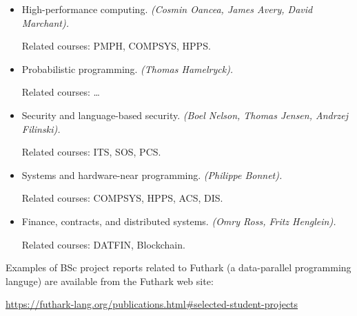 \documentclass[rgb,dvipsnames,aspectratio=169]{beamer}
\begin{document}
\begin{frame}[fragile]


  \vfill

  \begin{itemize}

  \item High-performance computing.
    \emph{(Cosmin Oancea, James Avery, David Marchant).}

    Related courses: PMPH, COMPSYS, HPPS.

  \item Probabilistic programming.
    \emph{(Thomas Hamelryck).}

    Related courses: …

  \item Security and language-based security.
    \emph{(Boel Nelson, Thomas Jensen, Andrzej Filinski).}

    Related courses: ITS, SOS, PCS.

  \item Systems and hardware-near programming.
    \emph{(Philippe Bonnet).}

    Related courses: COMPSYS, HPPS, ACS, DIS.

  \item Finance, contracts, and distributed systems.
    \emph{(Omry Ross, Fritz Henglein).}

    Related courses: DATFIN, Blockchain.
  \end{itemize}

\end{frame}

\begin{frame}[fragile]


  \vfill

  Examples of BSc project reports related to Futhark (a data-parallel
  programming languge) are available from the Futhark web site:

  \vfill
    \begin{center}
    \begin{footnotesize}
  \url{https://futhark-lang.org/publications.html#selected-student-projects}
    \end{footnotesize}
    \end{center}
\end{frame}
\end{document}
